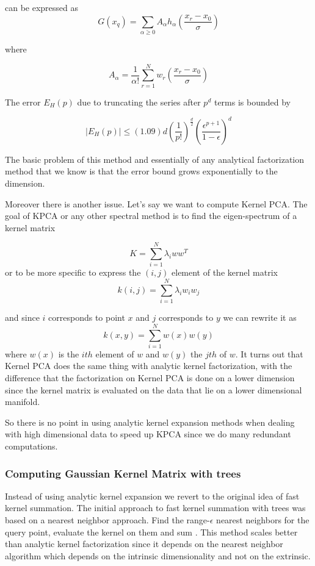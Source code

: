 \documentclass[12pt,letterpaper,doublespaced,ETD,dvips,proposal]{gtthesis}
\begin{document}
\begin{Body}
can be expressed as
\begin{equation}
  G(x_q)=\sum_{\alpha\geq 0} A_{\alpha} h_{\alpha}
  \left(\frac{x_r-x_0}{\sigma}\right)
\end{equation}

where

\begin{equation}
  A_{\alpha} = \frac{1}{\alpha!}
  \sum_{r=1}^{N}w_r\left(\frac{x_r-x_0}{\sigma}\right)
\end{equation}

The error $E_H(p)$ due to truncating the series after $p^d$ terms is
bounded by

\begin{equation}
|E_H(p)|\leq (1.09)d\left(\frac{1}{p!}\right)^{\frac{d}{2}}
\left(\frac{\epsilon^{p+1}}{1-\epsilon}\right)^d
\end{equation}

The basic problem of this method and essentially of any analytical
factorization method that we know is that the error bound grows
exponentially to the dimension.

Moreover there is another issue. Let's say we want to compute Kernel
PCA. The goal of KPCA or any other spectral method is to find the
eigen-spectrum of a kernel matrix

\begin{equation}
K = \sum_{i=1}^{N}\lambda_i ww^T
\end{equation}
or to be more specific to express the $(i, j)$ element of the kernel matrix
\begin{equation}
k(i,j)=\sum_{i=1}^{N}\lambda_i w_i w_j
\end{equation}

and since $i$ corresponds to point $x$ and $j$ corresponds to $y$
we can rewrite it as
\begin{equation}
k(x,y)=\sum_{i=1}^{N}w(x)w(y)
\end{equation}
where $w(x)$ is the $ith$ element of $w$ and $w(y)$ the $jth$ of $w$.
It turns out that  Kernel PCA does the same thing with analytic
kernel factorization, with the difference that the factorization on
Kernel PCA is done on a lower dimension since the kernel matrix is
evaluated on the data that lie on a lower dimensional manifold.

So there is no point in using analytic kernel expansion methods when
dealing with high dimensional data to speed up KPCA since we do many
redundant computations.


\subsubsection{Computing Gaussian Kernel Matrix with trees}
Instead of using analytic kernel expansion we revert to the original
idea of fast kernel summation. The initial approach to fast kernel
summation with trees was based on a nearest neighbor approach. Find
the range-$\epsilon$ nearest neighbors for the query point, evaluate
the kernel on them and sum \cite{gray2003rem}. This method scales better than analytic
kernel factorization since it depends on the nearest neighbor
algorithm which depends on the intrinsic dimensionality and not on
the extrinsic.


\end{Body}
\end{document}

